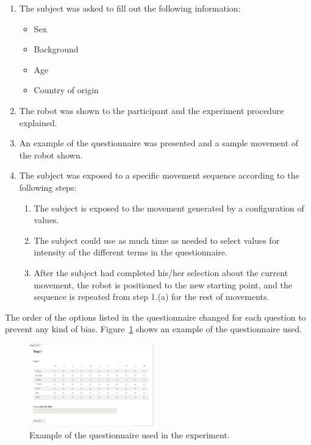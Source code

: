 \begin{enumerate}
	
	\item The subject was asked to fill out the following information:
	
	\begin{itemize}
		\item Sex
		\item Background
		\item Age
		\item Country of origin
	\end{itemize}
	
	\item The robot was shown to the participant and the experiment procedure explained.

	\item An example of the questionnaire was presented and a sample movement of the robot shown.

	\item The subject was exposed to a specific movement sequence according to the following steps:

	\begin{enumerate}

		\item The subject is exposed to the movement generated by a configuration of values.

		\item The subject could use as much time as needed to select values for intensity of the different terms in the questionnaire.

		\item After the subject had completed his/her selection about the current movement, the robot is positioned to the new starting point, and the sequence is repeated from step 1.(a) for the rest of movements.

	\end{enumerate}
\end{enumerate}

The order of the options listed in the questionnaire changed for each question to prevent any kind of bias. Figure~\ref{fig:questionnaire_example} shows an example of the questionnaire used. 

\begin{figure}
	\centering
	\includegraphics[width=0.48\textwidth]{./Images/example_survey.png} 
	\caption{Example of the questionnaire used in the experiment.}
	\label{fig:questionnaire_example}
\end{figure}

